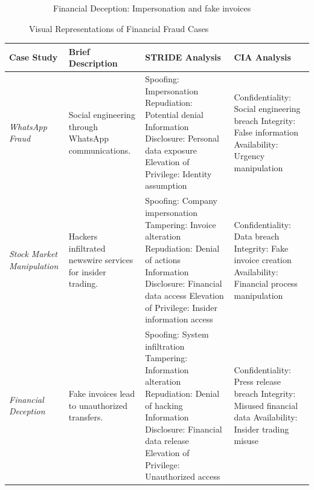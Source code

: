 \documentclass[11pt]{article}
\begin{document}
\begin{figure}[ht]
\begin{subfigure}{.3\textwidth}
      \caption{Financial Deception: Impersonation and fake invoices}
      \label{fig:sub3}
    \end{subfigure}
    \caption{Visual Representations of Financial Fraud Cases}
    \label{fig:test}
    \end{figure}

\begin{tabular}{@{}p{2cm}p{4cm}p{4cm}p{4cm}@{}}
\toprule
\textbf{Case Study} & \textbf{Brief Description} & \textbf{STRIDE Analysis} & \textbf{CIA Analysis} \\ 
\midrule
\textit{WhatsApp Fraud} & Social engineering through WhatsApp communications. & Spoofing: Impersonation \newline Repudiation: Potential denial \newline Information Disclosure: Personal data exposure \newline Elevation of Privilege: Identity assumption & Confidentiality: Social engineering breach \newline Integrity: False information \newline Availability: Urgency manipulation \\

\textit{Stock Market Manipulation} & Hackers infiltrated newswire services for insider trading. & Spoofing: Company impersonation \newline Tampering: Invoice alteration \newline Repudiation: Denial of actions \newline Information Disclosure: Financial data access \newline Elevation of Privilege: Insider information access & Confidentiality: Data breach \newline Integrity: Fake invoice creation \newline Availability: Financial process manipulation \\

\textit{Financial Deception} & Fake invoices lead to unauthorized transfers. & Spoofing: System infiltration \newline Tampering: Information alteration \newline Repudiation: Denial of hacking \newline Information Disclosure: Financial data release \newline Elevation of Privilege: Unauthorized access & Confidentiality: Press release breach \newline Integrity: Misused financial data \newline Availability: Insider trading misuse \\
\bottomrule
\end{tabular}
        
\end{document}
